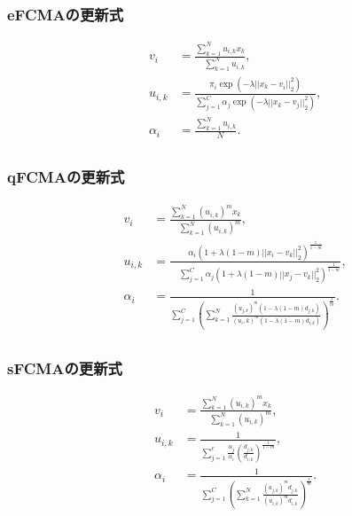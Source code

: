 \documentclass[13pt,dvipdfmx]{beamer}
\begin{document}
\begin{frame}\frametitle{eFCMAの更新式}
  \begin{eqnarray*}
    &v_{i}& =\frac{\sum_{k=1}^Nu_{i,k}x_{k}}{\quad\sum_{k=1}^Nu_{i,k}},\\
    &u_{i,k}&=\frac{\pi_{i}\exp(-\lambda||x_k-v_i||_2^2)}{\sum_{j=1}^C\alpha_{j}\exp(-\lambda||x_k-v_j||_2^2)},\\
    &\alpha_{i}&=\frac{\sum_{k=1}^Nu_{i,k}}{\quad N}.\\
  \end{eqnarray*}
\end{frame}

\begin{frame}\frametitle{qFCMAの更新式}
  \begin{eqnarray*}
    &v_{i}&=\frac{\sum_{k=1}^N(u_{i,k})^mx_{k}}{\quad\sum_{k=1}^N(u_{i,k})^{m}},\quad\\
    &u_{i,k}&=\frac{\alpha_{i}(1+\lambda(1-m)||x_i-v_k||_2^2)^\frac{1}{1-m}}{\quad\sum_{j=1}^C\alpha_{j}(1+\lambda(1-m)||x_j-v_k||_2^2)^\frac{1}{1-m}},\\
    & \alpha_{i}&=\frac{1}{\sum_{j=1}^C\left(\sum_{k=1}^N\frac{(u_{j,k})^m(1-\lambda(1-m)d_{j,k})}{(u_i,k)^m(1-\lambda(1-m)d_{i,k})}\right)^{\frac{1}{m}}}.\\
  \end{eqnarray*}
\end{frame}

\begin{frame}\frametitle{sFCMAの更新式}
  \begin{eqnarray*}
    &v_{i}&=\frac{\sum_{k=1}^N(u_{i,k})^mx_{k}}{\quad\sum_{k=1}^N(u_{i,k})^{m}},\\
    &u_{i,k}&=\frac{1}{\sum_{j=1}^c\frac{\alpha_{j}}{\alpha_{i}}\left(\frac{d_{j,k}}{d_{i,k}}\right)^\frac{1}{1-m}},\\
    &\alpha_{i}&=\frac{1}{\sum_{j=1}^C\left(\sum_{k=1}^N\frac{(u_{j,k})^md_{j,k}}{(u_{i,k})^md_{i,k}}\right)^{\frac{1}{m}}}.\\
  \end{eqnarray*}
\end{frame}
\end{document}
